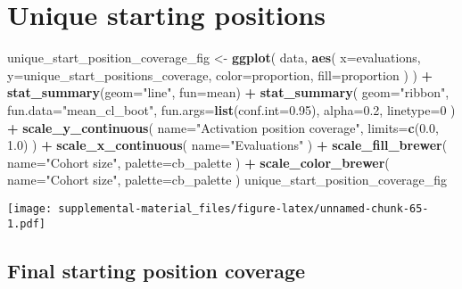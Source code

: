 \documentclass[]{book}
\newenvironment{Shaded}{\begin{snugshade}}{\end{snugshade}}
\newcommand{\DataTypeTok}[1]{\textcolor[rgb]{0.13,0.29,0.53}{#1}}
\newcommand{\DecValTok}[1]{\textcolor[rgb]{0.00,0.00,0.81}{#1}}
\newcommand{\FloatTok}[1]{\textcolor[rgb]{0.00,0.00,0.81}{#1}}
\newcommand{\KeywordTok}[1]{\textcolor[rgb]{0.13,0.29,0.53}{\textbf{#1}}}
\newcommand{\NormalTok}[1]{#1}
\newcommand{\OperatorTok}[1]{\textcolor[rgb]{0.81,0.36,0.00}{\textbf{#1}}}
\newcommand{\StringTok}[1]{\textcolor[rgb]{0.31,0.60,0.02}{#1}}
\begin{document}
\hypertarget{unique-starting-positions-5}{%
\section{Unique starting positions}\label{unique-starting-positions-5}}

\begin{Shaded}
\begin{Highlighting}[]
\NormalTok{unique_start_position_coverage_fig <-}\StringTok{ }\KeywordTok{ggplot}\NormalTok{(}
\NormalTok{    data,}
    \KeywordTok{aes}\NormalTok{(}
      \DataTypeTok{x=}\NormalTok{evaluations,}
      \DataTypeTok{y=}\NormalTok{unique_start_positions_coverage,}
      \DataTypeTok{color=}\NormalTok{proportion,}
      \DataTypeTok{fill=}\NormalTok{proportion}
\NormalTok{    )}
\NormalTok{  ) }\OperatorTok{+}
\StringTok{  }\KeywordTok{stat_summary}\NormalTok{(}\DataTypeTok{geom=}\StringTok{"line"}\NormalTok{, }\DataTypeTok{fun=}\NormalTok{mean) }\OperatorTok{+}
\StringTok{  }\KeywordTok{stat_summary}\NormalTok{(}
    \DataTypeTok{geom=}\StringTok{"ribbon"}\NormalTok{,}
    \DataTypeTok{fun.data=}\StringTok{"mean_cl_boot"}\NormalTok{,}
    \DataTypeTok{fun.args=}\KeywordTok{list}\NormalTok{(}\DataTypeTok{conf.int=}\FloatTok{0.95}\NormalTok{),}
    \DataTypeTok{alpha=}\FloatTok{0.2}\NormalTok{,}
    \DataTypeTok{linetype=}\DecValTok{0}
\NormalTok{  ) }\OperatorTok{+}
\StringTok{  }\KeywordTok{scale_y_continuous}\NormalTok{(}
    \DataTypeTok{name=}\StringTok{"Activation position coverage"}\NormalTok{,}
    \DataTypeTok{limits=}\KeywordTok{c}\NormalTok{(}\FloatTok{0.0}\NormalTok{, }\FloatTok{1.0}\NormalTok{)}
\NormalTok{  ) }\OperatorTok{+}
\StringTok{  }\KeywordTok{scale_x_continuous}\NormalTok{(}
    \DataTypeTok{name=}\StringTok{"Evaluations"}
\NormalTok{  ) }\OperatorTok{+}
\StringTok{  }\KeywordTok{scale_fill_brewer}\NormalTok{(}
    \DataTypeTok{name=}\StringTok{"Cohort size"}\NormalTok{,}
    \DataTypeTok{palette=}\NormalTok{cb_palette}
\NormalTok{  ) }\OperatorTok{+}
\StringTok{  }\KeywordTok{scale_color_brewer}\NormalTok{(}
    \DataTypeTok{name=}\StringTok{"Cohort size"}\NormalTok{,}
    \DataTypeTok{palette=}\NormalTok{cb_palette}
\NormalTok{  )}
\NormalTok{unique_start_position_coverage_fig}
\end{Highlighting}
\end{Shaded}

\texttt{[image: supplemental-material\_files/figure-latex/unnamed-chunk-65-1.pdf]}

\hypertarget{final-starting-position-coverage-4}{%
\subsection{Final starting position coverage}\label{final-starting-position-coverage-4}}
\end{document}
